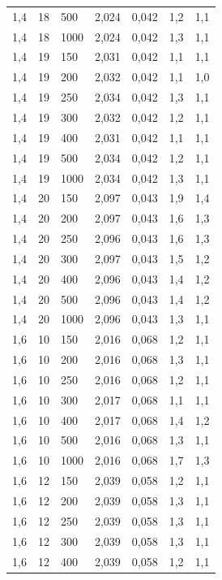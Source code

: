 \begin{tabular}{lllllll}
        1,4 & 18 & 500 & 2,024 & 0,042 & 1,2 & 1,1 \\ 
        1,4 & 18 & 1000 & 2,024 & 0,042 & 1,3 & 1,1 \\ 
        1,4 & 19 & 150 & 2,031 & 0,042 & 1,1 & 1,1 \\ 
        1,4 & 19 & 200 & 2,032 & 0,042 & 1,1 & 1,0 \\ 
        1,4 & 19 & 250 & 2,034 & 0,042 & 1,3 & 1,1 \\ 
        1,4 & 19 & 300 & 2,032 & 0,042 & 1,2 & 1,1 \\ 
        1,4 & 19 & 400 & 2,031 & 0,042 & 1,1 & 1,1 \\ 
        1,4 & 19 & 500 & 2,034 & 0,042 & 1,2 & 1,1 \\ 
        1,4 & 19 & 1000 & 2,034 & 0,042 & 1,3 & 1,1 \\ 
        1,4 & 20 & 150 & 2,097 & 0,043 & 1,9 & 1,4 \\ 
        1,4 & 20 & 200 & 2,097 & 0,043 & 1,6 & 1,3 \\ 
        1,4 & 20 & 250 & 2,096 & 0,043 & 1,6 & 1,3 \\ 
        1,4 & 20 & 300 & 2,097 & 0,043 & 1,5 & 1,2 \\ 
        1,4 & 20 & 400 & 2,096 & 0,043 & 1,4 & 1,2 \\ 
        1,4 & 20 & 500 & 2,096 & 0,043 & 1,4 & 1,2 \\ 
        1,4 & 20 & 1000 & 2,096 & 0,043 & 1,3 & 1,1 \\ 
        1,6 & 10 & 150 & 2,016 & 0,068 & 1,2 & 1,1 \\ 
        1,6 & 10 & 200 & 2,016 & 0,068 & 1,3 & 1,1 \\ 
        1,6 & 10 & 250 & 2,016 & 0,068 & 1,2 & 1,1 \\ 
        1,6 & 10 & 300 & 2,017 & 0,068 & 1,1 & 1,1 \\ 
        1,6 & 10 & 400 & 2,017 & 0,068 & 1,4 & 1,2 \\ 
        1,6 & 10 & 500 & 2,016 & 0,068 & 1,3 & 1,1 \\ 
        1,6 & 10 & 1000 & 2,016 & 0,068 & 1,7 & 1,3 \\ 
        1,6 & 12 & 150 & 2,039 & 0,058 & 1,2 & 1,1 \\ 
        1,6 & 12 & 200 & 2,039 & 0,058 & 1,3 & 1,1 \\ 
        1,6 & 12 & 250 & 2,039 & 0,058 & 1,3 & 1,1 \\ 
        1,6 & 12 & 300 & 2,039 & 0,058 & 1,3 & 1,1 \\ 
        1,6 & 12 & 400 & 2,039 & 0,058 & 1,2 & 1,1 \\ 

\end{tabular}
